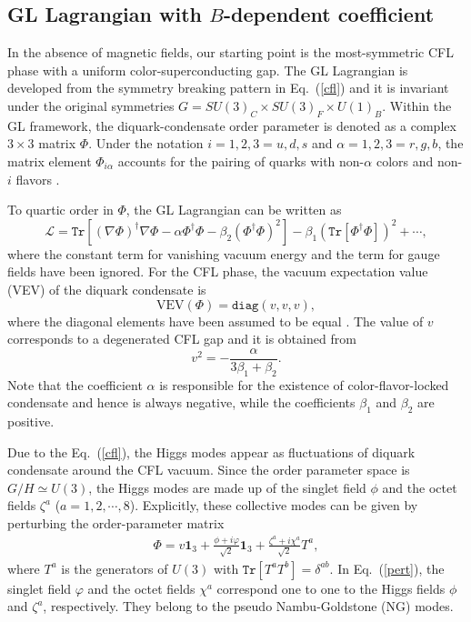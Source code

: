 \subsection{GL Lagrangian with $B$-dependent coefficient}
\label{sssec:1}
%

In the absence of magnetic fields, our starting point is the most-symmetric CFL phase with a uniform
color-superconducting gap. The GL Lagrangian is developed from the symmetry breaking pattern in Eq.~(\ref{cfl}) and it is invariant
under the original symmetries $G=SU(3)_C \times SU(3)_F\times U(1)_B$. Within the GL framework, the
diquark-condensate order parameter is denoted as a complex $3\times3$ matrix $\Phi$. Under the notation
$i = 1, 2, 3 = u, d, s$ and $\alpha = 1, 2, 3 = r, g, b$, the matrix element $\Phi_{i \alpha}$ accounts
for the pairing of quarks with non-$\alpha$ colors and non-$i$ flavors \cite{iida2002superfluid}.

To quartic order in $\Phi$, the GL Lagrangian can be written as~\cite{iida2002superfluid,giannakis2002ginzburg}
\begin{equation}
\mathcal{L}=
\texttt{Tr}\left[(\nabla\Phi)^\dagger\nabla\Phi
  -\alpha\Phi^\dagger\Phi -\beta_2(\Phi^\dagger\Phi)^2\right]
-\beta_1(\texttt{Tr}[\Phi^\dagger\Phi])^2 +\cdots ,\label{gl}
\end{equation}
where the constant term for vanishing vacuum energy and the term for gauge fields have been
ignored. For the CFL phase, the vacuum expectation value (VEV) of the diquark condensate is
\begin{equation}
  \text{VEV}(\Phi)=\texttt{diag}(v,v,v) ,\label{cflground}
\end{equation}
where the diagonal elements have been assumed to be equal \cite{iida2002superfluid}. The value of
$v$ corresponds to a degenerated CFL gap and it is obtained from
\begin{equation}
  \label{eq:dvaccum}
v^2 = -\frac{\alpha}{3\beta_1+\beta_2}.
\end{equation}
Note that the coefficient $\alpha$ is responsible for the existence of color-flavor-locked condensate
and hence is always negative, while the coefficients $\beta_1$ and $\beta_2$ are positive.

Due to the Eq.~(\ref{cfl}), the Higgs modes appear as fluctuations of diquark condensate around the
CFL vacuum. Since the order parameter space is $G/H \simeq U(3)$, the Higgs modes are made up of the
singlet field $\phi$ and the octet fields $\zeta^a$ ($a = 1, 2, \cdots, 8$). Explicitly, these
collective modes can be given by perturbing the order-parameter matrix
\begin{eqnarray}
\Phi=v\textbf{1}_3+\frac{\phi+i\varphi}{\sqrt{2}}\textbf{1}_3+\frac{\zeta^a+i\chi^a}{\sqrt{2}}T^a,
\label{pert}
\end{eqnarray}
where $T^a$ is the generators of $U(3)$ with $\texttt{Tr}[T^a T^b]=\delta^{ab}$.
In Eq.~(\ref{pert}), the singlet field $\varphi$ and the octet fields $\chi^a$ correspond one to
one to the Higgs fields $\phi$ and $\zeta^a$, respectively. They belong to the pseudo Nambu-Goldstone
(NG) modes.

